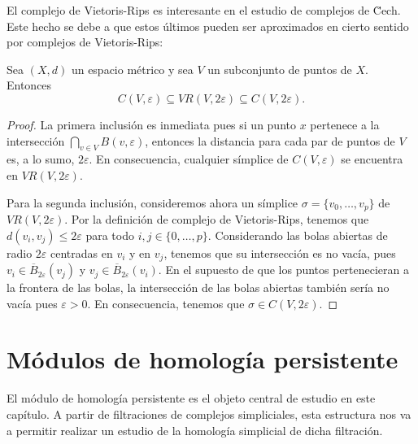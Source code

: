 El complejo de Vietoris-Rips es interesante en el estudio de complejos de \u Cech. Este hecho se debe a que estos últimos pueden ser aproximados en cierto sentido por complejos de Vietoris-Rips:

\begin{proposicion}
	Sea \((X,d)\) un espacio métrico y sea \(V\) un subconjunto de puntos de \(X\). Entonces
	\[
		C(V, \varepsilon) \subseteq VR(V, 2\varepsilon) \subseteq C(V, 2\varepsilon).
	\]
\end{proposicion}
\begin{proof}
	La primera inclusión es inmediata pues si un punto \(x\) pertenece a la intersección \(\bigcap_{v \in V} B(v, \varepsilon)\), entonces la distancia para cada par de puntos de \(V\) es, a lo sumo, \(2 \varepsilon\). En consecuencia, cualquier símplice de \(C(V,\varepsilon)\) se encuentra en \(VR(V, 2\varepsilon)\).
	
	Para la segunda inclusión, consideremos ahora un símplice \(\sigma = \{v_0, \dots, v_p\}\) de \(VR(V, 2\varepsilon)\). Por la definición de complejo de Vietoris-Rips, tenemos que \(d(v_i, v_j) \leq 2\varepsilon\) para todo \(i,j \in \{0, \dots, p\}\). Considerando las bolas abiertas de radio \(2\varepsilon\) centradas en \(v_i\) y en \(v_j\), tenemos que su intersección es no vacía, pues \(v_i \in \overline{B}_{2\varepsilon}(v_j)\) y \(v_j \in \overline{B}_{2\varepsilon}(v_i)\). En el supuesto de que los puntos pertenecieran a la frontera de las bolas, la intersección de las bolas abiertas también sería no vacía pues \(\varepsilon > 0\). En consecuencia, tenemos que \(\sigma \in C(V,2\varepsilon)\).
\end{proof}

\section{Módulos de homología persistente}

El módulo de homología persistente es el objeto central de estudio en este capítulo. A partir de filtraciones de complejos simpliciales, esta estructura nos va a permitir realizar un estudio de la homología simplicial de dicha filtración.


